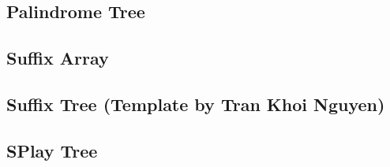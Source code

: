 \subsection{Palindrome Tree}
\raggedbottom
\hrulefill
\subsection{Suffix Array}
\raggedbottom
\hrulefill
\subsection{Suffix Tree (Template by Tran Khoi Nguyen)}
\raggedbottom
\hrulefill
\subsection{SPlay Tree}
\raggedbottom
\hrulefill

